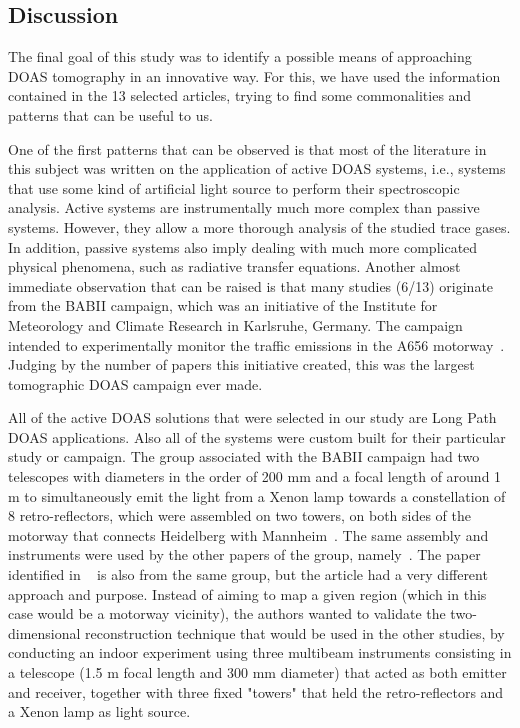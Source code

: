 \subsection{Discussion}
\label{sub:discussion}

The final goal of this study was to identify a possible means of
approaching DOAS tomography in an innovative way. For this, we have used
the information contained in the 13 selected articles, trying to find
some commonalities and patterns that can be useful to us.

One of the first patterns that can be observed is that most of the
literature in this subject was written on the application of active DOAS
systems, i.e., systems that use some kind of artificial light source to
perform their spectroscopic analysis. Active systems are instrumentally
much more complex than passive systems. However, they allow a more
thorough analysis of the studied trace gases. In addition, passive
systems also imply dealing with much more complicated physical
phenomena, such as radiative transfer equations. Another almost
immediate observation that can be raised is that many studies (6/13)
originate from the BABII campaign, which was an initiative of the
Institute for Meteorology and Climate Research in Karlsruhe, Germany.
The campaign intended to experimentally monitor the traffic emissions in
the A656 motorway~\cite{Laepple2004}. Judging by the number of papers
this initiative created, this was the largest tomographic DOAS campaign
ever made.

All of the active DOAS solutions that were selected in our study are
Long Path DOAS applications. Also all of the systems were custom built for
their particular study or campaign. The group associated with the BABII
campaign had two telescopes with diameters in the order of 200 mm and a
focal length of around 1 m to simultaneously emit the light from a Xenon
lamp towards a constellation of 8 retro-reflectors, which were assembled
on two towers, on both sides of the motorway that connects Heidelberg
with Mannheim~\cite{Pundt2005}. The same assembly and instruments were
used by the other papers of the group, namely~\cite{Hartl2006, Poehler,
Laepple2004}. The paper identified in ~\cite{Mettendorf2006} is also
from the same group, but the article had a very different approach and
purpose. Instead of aiming to map a given region (which in this case
would be a motorway vicinity), the authors wanted to validate the
two-dimensional reconstruction technique that would be used in the other
studies, by conducting an indoor experiment using three multibeam
instruments consisting in a telescope (1.5 m  focal length and 300 mm
diameter) that acted as both emitter and receiver, together with three
fixed "towers" that held the retro-reflectors and a Xenon lamp as light
source.

